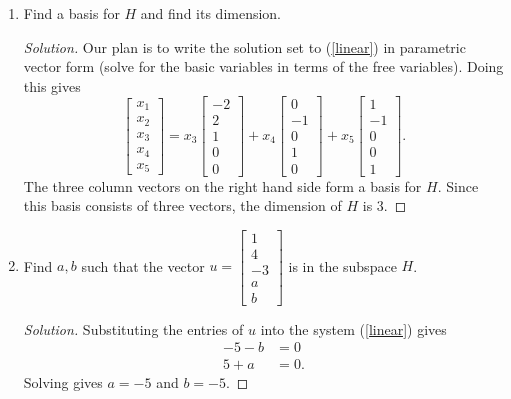 \documentclass[11pt,letterpaper]{report}
\newenvironment{solution}
{\begin{proof}[Solution]}
{\end{proof}}
\begin{document}
\begin{enumerate}
\begin{enumerate}
		\item Find a basis for $H$ and find its dimension.
		\begin{solution}
			Our plan is to write the solution set to (\ref{linear}) in parametric vector form (solve for the basic variables in terms of the free variables). Doing this gives
			\[
			\begin{bmatrix}
				x_1\\x_2\\x_3\\x_4\\x_5
			\end{bmatrix}= x_3 \begin{bmatrix}
				-2\\2\\1\\0\\0
			\end{bmatrix} + x_4 \begin{bmatrix}
				0\\-1\\0\\1\\0
			\end{bmatrix} + x_5 \begin{bmatrix}
				1\\-1\\0\\0\\1
			\end{bmatrix}.
			\]
			The three column vectors on the right hand side form a basis for $H$. Since this basis consists of three vectors, the dimension of $H$ is 3.
		\end{solution}

		\item Find $a,b$ such that the vector $u= \begin{bmatrix}
			1\\4\\-3\\a\\b
		\end{bmatrix}$ is in the subspace $H$.
		\begin{solution}
			Substituting the entries of $u$ into the system (\ref{linear}) gives
			\begin{align*}
				-5 - b &= 0\\
				5+a&= 0.
			\end{align*}
			Solving gives $a = -5$ and $b = -5$.
		\end{solution}


\end{enumerate}
\end{enumerate}
\end{document}
